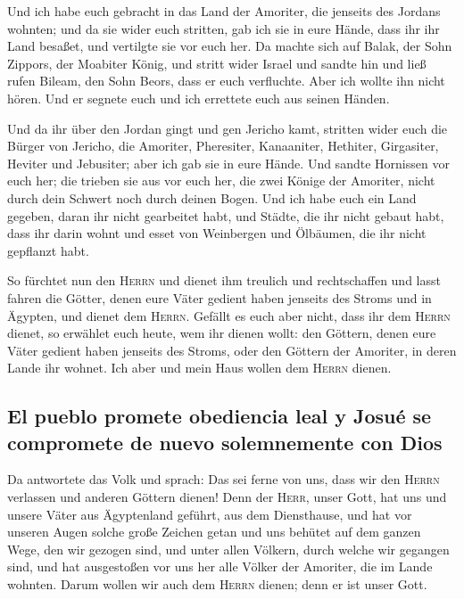  Und ich habe euch gebracht in das Land der Amoriter, die
jenseits des Jordans wohnten; und da sie wider euch stritten, gab ich
sie in eure Hände, dass ihr ihr Land besaßet, und vertilgte sie vor euch
her.  Da machte sich auf Balak, der Sohn Zippors, der
Moabiter König, und stritt wider Israel und sandte hin und ließ rufen
Bileam, den Sohn Beors, dass er euch verfluchte.  Aber
ich wollte ihn nicht hören. Und er segnete euch und ich errettete euch
aus seinen Händen.

 Und da ihr über den Jordan gingt und gen Jericho kamt,
stritten wider euch die Bürger von Jericho, die Amoriter, Pheresiter,
Kanaaniter, Hethiter, Girgasiter, Heviter und Jebusiter; aber ich gab
sie in eure Hände.  Und sandte Hornissen vor euch her;
die trieben sie aus vor euch her, die zwei Könige der Amoriter, nicht
durch dein Schwert noch durch deinen Bogen.  Und ich habe
euch ein Land gegeben, daran ihr nicht gearbeitet habt, und Städte, die
ihr nicht gebaut habt, dass ihr darin wohnt und esset von Weinbergen und
Ölbäumen, die ihr nicht gepflanzt habt.

 So fürchtet nun den \textsc{Herrn} und dienet ihm
treulich und rechtschaffen und lasst fahren die Götter, denen eure Väter
gedient haben jenseits des Stroms und in Ägypten, und dienet dem
\textsc{Herrn}.  Gefällt es euch aber nicht, dass ihr dem
\textsc{Herrn} dienet, so erwählet euch heute, wem ihr dienen wollt: den
Göttern, denen eure Väter gedient haben jenseits des Stroms, oder den
Göttern der Amoriter, in deren Lande ihr wohnet. Ich aber und mein Haus
wollen dem \textsc{Herrn} dienen.

\hypertarget{el-pueblo-promete-obediencia-leal-y-josuuxe9-se-compromete-de-nuevo-solemnemente-con-dios}{%
\subsection{El pueblo promete obediencia leal y Josué se compromete de
nuevo solemnemente con
Dios}\label{el-pueblo-promete-obediencia-leal-y-josuuxe9-se-compromete-de-nuevo-solemnemente-con-dios}}

 Da antwortete das Volk und sprach: Das sei ferne von
uns, dass wir den \textsc{Herrn} verlassen und anderen Göttern dienen!
 Denn der \textsc{Herr}, unser Gott, hat uns und unsere
Väter aus Ägyptenland geführt, aus dem Diensthause, und hat vor unseren
Augen solche große Zeichen getan und uns behütet auf dem ganzen Wege,
den wir gezogen sind, und unter allen Völkern, durch welche wir gegangen
sind,  und hat ausgestoßen vor uns her alle Völker der
Amoriter, die im Lande wohnten. Darum wollen wir auch dem \textsc{Herrn}
dienen; denn er ist unser Gott.

